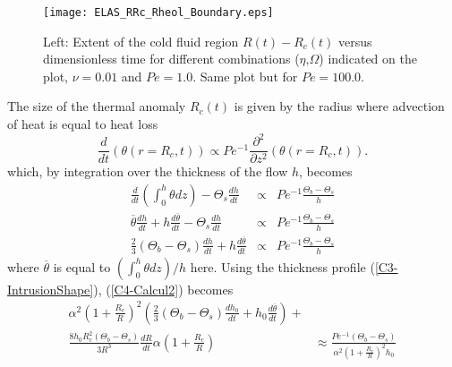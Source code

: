 \begin{figure}[htpb]
  \begin{center}
    \graphicspath{ {/Users/thorey/Documents/These/Projet/Refroidissement/Skin_Model/Figure/Figure_Heating/} }
    \texttt{[image: ELAS\_RRc\_Rheol\_Boundary.eps]}
    \caption{Left:  Extent  of  the cold  fluid  region  $R(t)-R_c(t)$
      versus   dimensionless    time   for    different   combinations
      ($\eta$,$\Omega$)   indicated  on   the  plot,   $\nu=0.01$  and
      $Pe=1.0$. Same plot but for $Pe=100.0$.}
    \label{C4-ELAS_RRc_Rheol_Boundary}
  \end{center}
\end{figure}

The size of the thermal anomaly  $R_c(t)$ is given by the radius where
advection of heat is equal to heat loss
\begin{equation}
  \frac{d}{d    t}\left(\theta(r=   R_c,t)\right)    \propto   Pe^{-1}
  \frac{\partial^2}{\partial z^2}\left(\theta(r=R_c,t)\right).
  \label{C4-HeatequationThermal}
\end{equation}
which, by integration over the thickness of the flow $h$, becomes
\begin{eqnarray}
  \frac{d}{dt}\left(\int_0^h\theta           dz\right)-\Theta_s\frac{d
  h}{dt}&\propto& Pe^{-1} \frac{\Theta_b-\Theta_s}{h}\nonumber\\
  \overline{\theta}\frac{d h}{dt}+h\frac{d \overline{\theta}}{dt}-\Theta_s\frac{d
  h}{dt}&\propto& Pe^{-1}
                  \frac{\Theta_b-\Theta_s}{h}\nonumber\\
  \frac{2}{3}\left(\Theta_b-\Theta_s\right)\frac{d h}{d t} +h\frac{d\overline{\theta}}{dt}&\propto& Pe^{-1}
                                                                                                    \frac{\Theta_b-\Theta_s}{h}\label{C4-Calcul2}
\end{eqnarray}
where $\overline{\theta}$  is equal to $(\int_0^h  \theta dz)/h$ here.
Using     the     thickness     profile     (\ref{C3-IntrusionShape}),
(\ref{C4-Calcul2}) becomes
\begin{eqnarray}
  \alpha^2\left(1+\frac{R_c}{R}\right)^2\left(\frac{2}{3}\left(\Theta_b-\Theta_s\right)\frac{d h_0}{d
  t}+h_0\frac{d \overline{\theta}}{d
  t}\right)+&\nonumber\\
  \frac{8h_0R_c^2\left(\Theta_b-\Theta_s\right)}{3R^3}\frac{d
  R}{d
  t}\alpha\left(1+\frac{R_c}{R}\right)                        &\approx
                                                                \frac{Pe^{-1}\left(\Theta_b-\Theta_s\right)}{\alpha^2\left(1+\frac{R_c}{R}\right)^2h_0}
                                                                \label{C4-bill}
\end{eqnarray}
